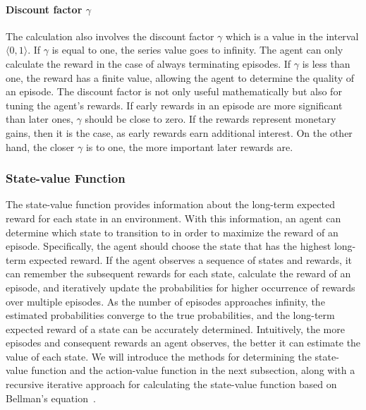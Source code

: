 \documentclass[../xlapes02]{subfiles}
\begin{document}
    \paragraph{Discount factor $\gamma$}\label{par:discount-factor}
    The calculation also involves the discount factor $\gamma$ which is a value in the interval $\langle 0, 1 \rangle$. If $\gamma$ is equal to one, the series value goes to infinity. The agent can only calculate the reward in the case of always terminating episodes. If $\gamma$ is less than one, the reward has a finite value, allowing the agent to determine the quality of an episode. The discount factor is not only useful mathematically but also for tuning the agent's rewards. If early rewards in an episode are more significant than later ones, $\gamma$ should be close to zero. If the rewards represent monetary gains, then it is the case, as early rewards earn additional interest. On the other hand, the closer $\gamma$ is to one, the more important later rewards are.

    \subsubsection{State-value Function}\label{subsubsec:state-value-function}
    The state-value function provides information about the long-term expected reward for each state in an environment. With this information, an agent can determine which state to transition to in order to maximize the reward of an episode. Specifically, the agent should choose the state that has the highest long-term expected reward. If the agent observes a sequence of states and rewards, it can remember the subsequent rewards for each state, calculate the reward of an episode, and iteratively update the probabilities for higher occurrence of rewards over multiple episodes. As the number of episodes approaches infinity, the estimated probabilities converge to the true probabilities, and the long-term expected reward of a state can be accurately determined. Intuitively, the more episodes and consequent rewards an agent observes, the better it can estimate the value of each state. We will introduce the methods for determining the state-value function and the action-value function in the next subsection, along with a recursive iterative approach for calculating the state-value function based on Bellman's equation~\cite{FITMT25127}.
\end{document}
